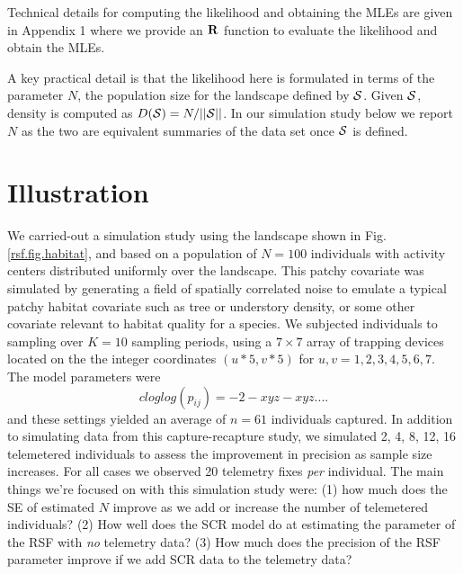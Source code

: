 Technical details for computing the likelihood and obtaining the MLEs
are given in Appendix 1 where we provide an ${\bf R}$ function to
evaluate the likelihood and obtain the MLEs.  

A key practical detail
is that the likelihood here is formulated in terms of the parameter
$N$, the population size for the landscape defined by ${\cal
  S}$. Given ${\cal S}$, density is computed as $D({\cal S}) =
N/||{\cal S}||$. In our simulation study below we report $N$ as the
two are equivalent summaries of the data set once ${\cal S}$ is
defined.


\section{Illustration}


We carried-out a simulation study using the landscape shown in
Fig. \ref{rsf.fig.habitat}, and based on a population of $N=100$
individuals with activity centers distributed uniformly over the
landscape.  This patchy covariate was simulated by generating a field
of spatially correlated noise to emulate a typical patchy habitat
covariate such as tree or understory density, or some other covariate
relevant to habitat quality for a species.  We subjected individuals
to sampling over $K=10$ sampling periods, using a $7 \times 7$ array
of trapping devices located on the the integer coordinates $(u*5,v*5)$
for $u,v = 1,2,3,4,5,6,7$. The model parameters were
\[
 cloglog(p_{ij}) = -2 -xyz -xyz....
\]
and these settings yielded an average of $n=61$ individuals captured.
In addition to simulating data from this capture-recapture study, we
simulated 2, 4, 8, 12, 16 telemetered individuals to assess the
improvement in precision as sample size increases.  For all cases we
observed 20 telemetry fixes {\it per} individual.  The main things
we're focused on with this simulation study were: (1) how much does
the SE of estimated $N$ improve as we add or increase the number of
telemetered individuals?  (2) How well does the SCR model do at
estimating the parameter of the RSF with {\it no} telemetry data?  (3)
How much does the precision of the RSF parameter improve if we add SCR
data to the telemetry data?



